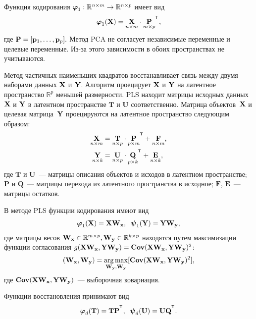 Функция кодирования $\boldsymbol{\varphi}_1: \mathbb{R}^{n \times m} \to \mathbb{R}^{n \times p}$ имеет вид
\begin{equation}
	\bphi_1(\bX) =  \underset{n \times m}\bX \cdot \underset{m \times p}\bP^{\T},
	\label{eq:PCA2}
\end{equation}
где $\mathbf{P} = [\mathbf{p}_1, \dots, \mathbf{p}_{p}].$
Метод PCA не согласует независимые переменные и целевые переменные. Из-за этого зависимости в обоих пространствах не учитываются.


Метод частичных наименьших квадратов восстанавливает связь между двумя наборами данных $\mathbf{X}$ и $\mathbf{Y}$. Алгоритм проецирует $\mathbf{X}$ и $\mathbf{Y}$ на латентное пространство $\mathbb{R}^{p}$ меньшей размерности. PLS находит матрицы исходных данных $\mathbf{X}$ и $\mathbf{Y}$ в латентном пространстве $\textbf{T}$ и $\textbf{U}$ соответственно. Матрица объектов~$\mathbf{X}$ и целевая матрица~$\mathbf{Y}$ проецируются на латентное пространство следующим образом:
\begin{align}
	\underset{n \times m}{\bX}  &= \underset{n \times p}{\textbf{T}} \cdot \underset{p \times m}{\textbf{P}}^{\T} +  \underset{n \times m}{\textbf{F}},
	\label{eq:PLSpr1} \\
	\underset{n \times k}{\bY}  &= \underset{n \times p}{\textbf{U}} \cdot \underset{p \times k}{\bQ}^{\T} + \underset{n \times k}{\textbf{E}},
	\label{eq:PLSpr2}
\end{align}
где $\textbf{T}$ и $\textbf{U}$~--- матрицы описания объектов и исходов в латентном пространстве; $\textbf{P}$ и $\textbf{Q}$~--- матрицы перехода из латентного пространства в исходное; $\textbf{F}$, $\textbf{E}$~--- матрицы остатков.

В методе PLS  функции кодирования имеют вид
\begin{equation*}
	\boldsymbol{\varphi}_1(\mathbf{X}) = \mathbf{X} \mathbf{W}_{\mathbf{x}}, \;\;
	\boldsymbol{\psi}_1(\mathbf{Y}) = \mathbf{Y} \mathbf{W}_{\mathbf{y}},
\end{equation*}
где матрицы весов $\mathbf{W}_{\mathbf{x}} \in \mathbb{R}^{m \times p}, \mathbf{W}_{\mathbf{y}} \in \mathbb{R}^{k \times p}$ находятся путем максимизации функции согласования $g(\mathbf{X} \mathbf{W}_{\mathbf{x}},  \mathbf{Y} \mathbf{W}_{\mathbf{y}}) = \textbf{Cov} (\mathbf{X} \mathbf{W}_{\mathbf{x}},  \mathbf{Y} \mathbf{W}_{\mathbf{y}})^{2}$:
\begin{equation}
	(\mathbf{W}_{\mathbf{x}}, \mathbf{W}_{\mathbf{y}}) = \mathop{\arg \max}\limits_{\mathbf{W}_{\mathbf{y}}, \mathbf{W}_{\mathbf{y}}}[ \textbf{Cov}(\mathbf{X} \mathbf{W}_{\mathbf{x}}, \mathbf{Y} \mathbf{W}_{\mathbf{y}})^{2}],
\label{eq:PLSpr3}
\end{equation}
где $\textbf{Cov}(\mathbf{X} \mathbf{W}_{\mathbf{x}}, \mathbf{Y} \mathbf{W}_{\mathbf{y}})$~--- выборочная ковариация.

Функции восстановления принимают вид
\begin{equation*}
	\bphi_d(\bT) = \bT\bP^{\T}, \;\;
	\bpsi_d(\bU) = \bU \bQ^{\T}.
\end{equation*}

